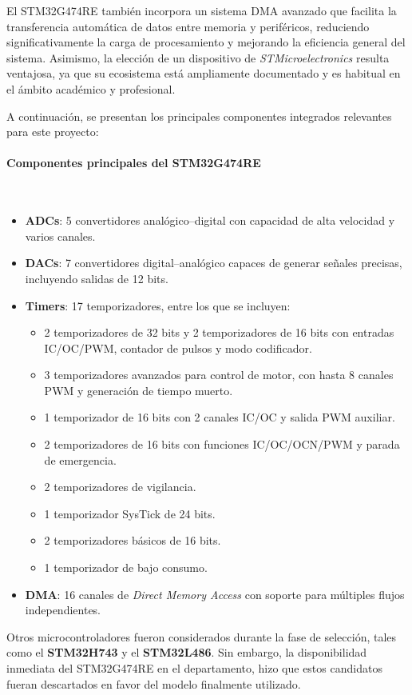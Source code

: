 \documentclass[11pt,a4paper]{article}
\newcommand{\myparagraph}[1]{\paragraph{#1}\mbox{}\\}
\begin{document}
El STM32G474RE también incorpora un sistema DMA avanzado que facilita la transferencia automática de datos entre memoria y periféricos, reduciendo significativamente la carga de procesamiento y mejorando la eficiencia general del sistema. Asimismo, la elección de un dispositivo de \textit{STMicroelectronics} resulta ventajosa, ya que su ecosistema está ampliamente documentado y es habitual en el ámbito académico y profesional.

A continuación, se presentan los principales componentes integrados relevantes para este proyecto:

\myparagraph{Componentes principales del STM32G474RE}

\begin{itemize}
    \item \textbf{ADCs}: 5 convertidores analógico--digital con capacidad de alta velocidad y varios canales.
    \item \textbf{DACs}: 7 convertidores digital--analógico capaces de generar señales precisas, incluyendo salidas de 12 bits.
    \item \textbf{Timers}: 17 temporizadores, entre los que se incluyen:
    \begin{itemize}
        \item 2 temporizadores de 32 bits y 2 temporizadores de 16 bits con entradas IC/OC/PWM, contador de pulsos y modo codificador.
        \item 3 temporizadores avanzados para control de motor, con hasta 8 canales PWM y generación de tiempo muerto.
        \item 1 temporizador de 16 bits con 2 canales IC/OC y salida PWM auxiliar.
        \item 2 temporizadores de 16 bits con funciones IC/OC/OCN/PWM y parada de emergencia.
        \item 2 temporizadores de vigilancia.
        \item 1 temporizador SysTick de 24 bits.
        \item 2 temporizadores básicos de 16 bits.
        \item 1 temporizador de bajo consumo.
    \end{itemize}
    \item \textbf{DMA}: 16 canales de \textit{Direct Memory Access} con soporte para múltiples flujos independientes.
\end{itemize}

Otros microcontroladores fueron considerados durante la fase de selección, tales como el \textbf{STM32H743} y el \textbf{STM32L486}. Sin embargo, la disponibilidad inmediata del STM32G474RE en el departamento, hizo que estos candidatos fueran descartados en favor del modelo finalmente utilizado.
\end{document}
